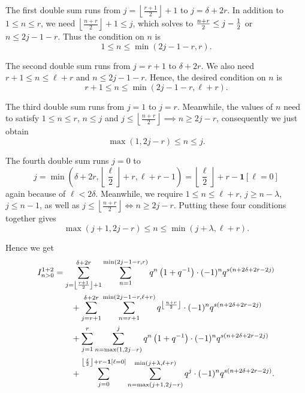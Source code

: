 \begin{itemize}
  \ii The first double sum runs from $j=\left\lfloor \frac{r+1}{2} \right\rfloor+1$ to $j=\delta+2r$.
  In addition to $1 \le n \le r$,
  we need $\left\lfloor \frac{n+r}{2} \right\rfloor + 1 \leq j$,
  which solves to $\frac{n+r}{2} \leq j-\frac{1}{2}$ or $n \leq 2j-1-r$.
  Thus the condition on $n$ is
  \[ 1 \leq n \leq \min(2j-1-r, r). \]

  \ii The second double sum runs from $j=r+1$ to $\delta+2r$.
  We also need $r+1 \le n \le \ell+r$ and $n \le 2j-1-r$.
  Hence, the desired condition on $n$ is
  \[ r+1 \leq n \leq \min(2j-1-r, \ell+r). \]

  \ii The third double sum runs from $j=1$ to $j=r$.
  Meanwhile, the values of $n$ need to satisfy $1 \le n \le r$, $n \leq j$
  and $j \leq \left\lfloor \frac{n+r}{2} \right\rfloor \implies n \geq 2j-r$,
  consequently we just obtain
  \[ \max(1, 2j-r) \leq n \leq j. \]

  \ii The fourth double sum runs $j=0$ to
  \[ j=\min\left( \delta+2r, \left\lfloor \frac{\ell}{2} \right\rfloor + r, \ell+r-1 \right)
    = \left\lfloor \frac{\ell}{2} \right\rfloor + r - \mathbf{1}[\ell = 0] \]
  again because of $\ell < 2\delta$.
  Meanwhile, we require $1 \le n \le \ell+r$, $j \ge n-\lambda$, $j \le n-1$,
  as well as $j \le \left\lfloor \frac{n+r}{2} \right\rfloor
  \iff n \ge 2j-r$.
  Putting these four conditions together gives
  \[ \max(j+1, 2j-r) \le n \le \min(j+\lambda, \ell+r). \]
\end{itemize}
Hence we get
\begin{align*}
  I_{n > 0}^{\text{1+2}}
  &= \sum_{j = \left\lfloor \frac{r+1}{2} \right\rfloor+ 1}^{\delta+2r}
    \sum_{n=1}^{\min(2j-1-r, r)}
    q^{n} \left( 1 + q^{-1} \right) \cdot (-1)^n q^{s(n+2\delta+2r-2j)} \\
  &\qquad+ \sum_{j = r+1}^{\delta + 2r}
    \sum_{n=r+1}^{\min(2j-1-r, \ell+r)}
    q^{\left\lfloor \frac{n+r}{2} \right\rfloor} \cdot (-1)^n q^{s(n+2\delta+2r-2j)} \\
  &\qquad+ \sum_{j=1}^{r}
    \sum_{n=\max(1,2j-r)}^{j}
    q^{n} \left( 1 + q^{-1} \right) \cdot (-1)^n q^{s(n+2\delta+2r-2j)} \\
  &\qquad+ \sum_{j=0}^{\left\lfloor \frac{\ell}{2} \right\rfloor + r - \mathbf{1}[\ell = 0]}
    \sum_{n=\max(j+1, 2j-r)}^{\min(j+\lambda, \ell+r)}
    q^{j} \cdot (-1)^n q^{s(n+2\delta+2r-2j)}.
\end{align*}

